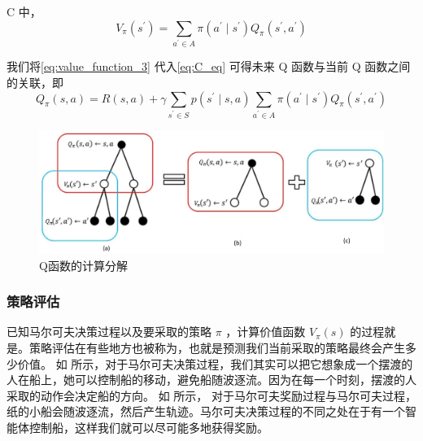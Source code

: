  C 中，
\begin{equation}
  V_{\pi}\left(s^{\prime}\right)=\sum_{a^{\prime} \in A} \pi\left(a^{\prime} \mid s^{\prime}\right) Q_{\pi}\left(s^{\prime}, a^{\prime}\right) 
  \label{eq:value_function_3}
\end{equation}

我们将\eqref{eq:value_function_3} 代入\eqref{eq:C_eq} 可得未来 Q 函数与当前 Q 函数之间的关联，即
\begin{equation}
  Q_{\pi}(s, a)=R(s, a)+\gamma \sum_{s^{\prime} \in S} p\left(s^{\prime} \mid s, a\right) \sum_{a^{\prime} \in A} \pi\left(a^{\prime} \mid s^{\prime}\right) Q_{\pi}\left(s^{\prime}, a^{\prime}\right)
\end{equation}

\begin{figure}[hbt]
  \centering
  \includegraphics[width=0.6\linewidth]{res/ch2/q_function_backup}
  \caption{Q函数的计算分解}
  \label{fig:q_function_backup}
\end{figure}

\subsubsection{策略评估}

已知马尔可夫决策过程以及要采取的策略 $\pi$ ，计算价值函数 $V_{\pi}(s)$ 的过程就是。策略评估在有些地方也被称为，也就是预测我们当前采取的策略最终会产生多少价值。
如 所示，对于马尔可夫决策过程，我们其实可以把它想象成一个摆渡的人在船上，她可以控制船的移动，避免船随波逐流。因为在每一个时刻，摆渡的人采取的动作会决定船的方向。
如 所示，
对于马尔可夫奖励过程与马尔可夫过程，纸的小船会随波逐流，然后产生轨迹。马尔可夫决策过程的不同之处在于有一个智能体控制船，这样我们就可以尽可能多地获得奖励。

